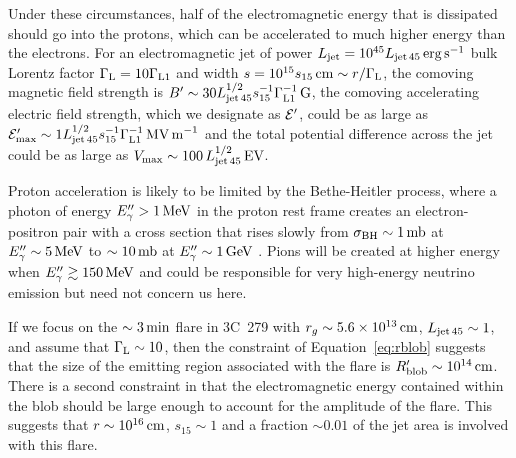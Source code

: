 \documentclass[twocolumn]{aastex62}
\begin{document}
Under these circumstances, half of the electromagnetic energy that is dissipated should go into the protons, which can be accelerated to much higher energy than the electrons. For an electromagnetic jet of power $L_{\rm jet}=10^{45}L_{\rm jet\,45}\,{\rm erg\,s}^{-1}$ bulk Lorentz factor $\Gamma_{\rm L}=10\Gamma_{\rm L1}$ and width $s=10^{15}s_{15}\,{\rm cm}\sim r/\Gamma_{\rm L}$, the comoving magnetic field strength is $B'\sim30L_{\rm jet\,45}^{1/2}s_{15}^{-1}\Gamma_{\rm L1}^{-1}\,{\rm G}$, 
the comoving accelerating electric field strength, which we designate as $\cal E'$, could be as large as ${\cal E}'_{\rm max}\sim1L_{\rm jet\,45}^{1/2}s_{15}^{-1}\Gamma_{\rm L1}^{-1}\,{\rm MV\,m}^{-1}$
and the total potential difference across the jet could be as large as $V_{\rm max}\sim100\,L_{\rm jet\,45}^{1/2}\,{\rm EV}$. 

Proton acceleration is likely to be limited by the Bethe-Heitler process, where a photon of energy $E''_\gamma>1\,{\rm MeV}$ in the proton rest frame creates an electron-positron pair with a cross section that rises slowly from $\sigma_{\rm BH}\sim1\,{\rm mb}$ at $E_\gamma''\sim5\,{\rm MeV}$ to $\sim 10\,{\rm mb}$ at $E_\gamma''\sim1\,{\rm GeV}$ \citep[e.g.,][]{2009herb.book.....D}. Pions will be created at higher energy when $E''_{\gamma}\gtrsim150\,{\rm MeV}$ and could be responsible for very high-energy neutrino emission but need not concern us here. 

If we focus on the $\sim3\,{\rm min}$ flare in 3C~279 with %
$r_g\sim5.6\times10^{13}\,{\rm cm}$, 
$L_{\rm jet\,45}\sim1$, and assume that $\Gamma_{\rm L}\sim10$, then the constraint of Equation~\ref{eq:rblob} suggests that the size of the emitting region associated with the flare is $R'_{\rm blob}\sim10^{14}\,{\rm cm}$. There is a second constraint in that the electromagnetic energy contained within the blob should be large enough to account for the amplitude of the flare. This suggests that $r\sim10^{16}\,{\rm cm}$, $s_{15}\sim1$ and a fraction $\sim0.01$ of the jet area is involved with this flare. 
\end{document}
